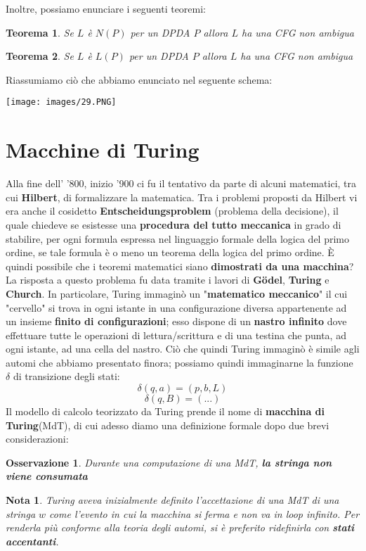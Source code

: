 \documentclass[12pt]{article}
\newtheorem{Teorema}{Teorema}[subsection]
\newtheorem{Osservazione}{Osservazione}[subsection]
\newtheorem{Nota}{Nota}[subsection]
\begin{document}
Inoltre, possiamo enunciare i seguenti teoremi:
\begin{Teorema}
    Se $L$ è $N(P)$ per un DPDA $P$ allora $L$ ha una CFG non ambigua
\end{Teorema}
\begin{Teorema}
    Se $L$ è $L(P)$ per un DPDA $P$ allora $L$ ha una CFG non ambigua
\end{Teorema}
Riassumiamo ciò che abbiamo enunciato nel seguente schema:
\begin{center}
    \texttt{[image: images/29.PNG]}
\end{center}

\section{Macchine di Turing}
Alla fine dell' '800, inizio '900 ci fu il tentativo da parte di alcuni matematici, tra cui \textbf{Hilbert}, di formalizzare la matematica. Tra i problemi proposti da Hilbert vi era anche il cosidetto \textbf{Entscheidungsproblem} (problema della decisione), il quale chiedeve se esistesse una \textbf{procedura del tutto meccanica} in grado di stabilire, per ogni formula espressa nel linguaggio formale della logica del primo ordine, se tale formula è o meno un teorema della logica del primo ordine. È quindi possibile che i teoremi matematici siano \textbf{dimostrati da una macchina}? La risposta a questo problema fu data tramite i lavori di \textbf{Gödel}, \textbf{Turing} e \textbf{Church}. In particolare, Turing immaginò un "\textbf{matematico meccanico}" il cui "cervello" si trova in ogni istante in una configurazione diversa appartenente ad un insieme \textbf{finito di configurazioni}; esso dispone di un \textbf{nastro infinito} dove effettuare tutte le operazioni di lettura/scrittura e di una testina che punta, ad ogni istante, ad una cella del nastro. Ciò che quindi Turing immaginò è simile agli automi che abbiamo presentato finora; possiamo quindi immaginarne la funzione $\delta$ di transizione degli stati:
$$\delta(q, a) = (p, b, L)$$
$$\delta(q, B) = (...)$$
Il modello di calcolo teorizzato da Turing prende il nome di \textbf{macchina di Turing}(MdT), di cui adesso diamo una definizione formale dopo due brevi considerazioni:
\begin{Osservazione}
    Durante una computazione di una MdT, \textbf{la stringa non viene consumata}
\end{Osservazione}
\begin{Nota}
    Turing aveva inizialmente definito l'accettazione di una MdT di una stringa $w$ come l'evento in cui la macchina si ferma e non va in loop infinito. Per renderla più conforme alla teoria degli automi, si è preferito ridefinirla con \textbf{stati accentanti}.
\end{Nota}
\end{document}
